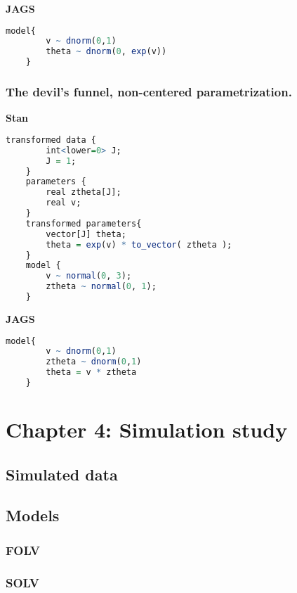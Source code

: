 \noindent \textbf{JAGS} \\
%
\begin{lstlisting}[language=R]
	model{
		v ~ dnorm(0,1)
		theta ~ dnorm(0, exp(v))
	}
\end{lstlisting}



\subsubsection{The devil's funnel, non-centered parametrization.}

\textbf{Stan} \\
%
\begin{lstlisting}[language=R]
	transformed data {
		int<lower=0> J;
		J = 1;
	}
	parameters {
		real ztheta[J];
		real v;
	}
	transformed parameters{
		vector[J] theta;
		theta = exp(v) * to_vector( ztheta );
	}
	model {
		v ~ normal(0, 3);
		ztheta ~ normal(0, 1);
	}
\end{lstlisting}


\noindent \textbf{JAGS} \\
%
\begin{lstlisting}[language=R]
	model{
		v ~ dnorm(0,1)
		ztheta ~ dnorm(0,1)
		theta = v * ztheta
	}
\end{lstlisting}




\section{Chapter 4: Simulation study} \label{appC2:chapter4}

\subsection{Simulated data} \label{appC2_1:sim}


\subsection{Models} \label{appC2_2:models}

\subsubsection{FOLV} 



\subsubsection{SOLV} 


